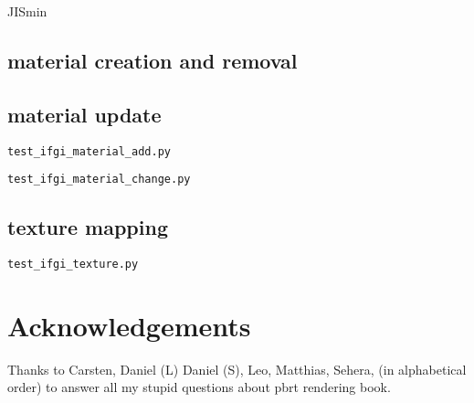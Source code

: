 \documentclass[12pt]{scrartcl}\usepackage{CJK}
\begin{document}
\begin{CJK*}[dnp]{JIS}{min}
\subsection{material creation and removal}

\subsection{material update}

\verb|test_ifgi_material_add.py|

 \verb|test_ifgi_material_change.py|

\subsection{texture mapping}
 \verb|test_ifgi_texture.py|


\section*{Acknowledgements}

Thanks to
Carsten,
Daniel (L)
Daniel (S),
Leo,
Matthias,
Sehera,
(in alphabetical order) to answer all my stupid questions about pbrt
rendering book.

\end{CJK*}
\end{document}
